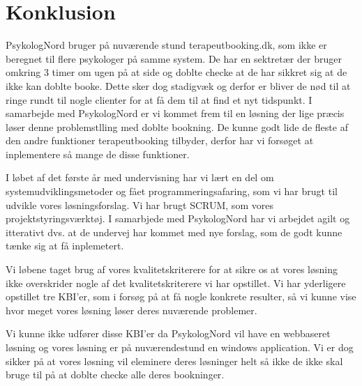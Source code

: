 \section{Konklusion}
PsykologNord bruger på nuværende stund terapeutbooking.dk, som ikke er beregnet til flere psykologer på samme system.
De har en sektretær der bruger omkring 3 timer om ugen på at side og doblte checke at de har sikkret sig at de ikke kan doblte booke.
Dette sker dog stadigvæk og derfor er bliver de nød til at ringe rundt til nogle clienter for at få dem til at find et nyt tidspunkt.
I samarbejde med PsykologNord er vi kommet frem til en løsning der lige præcis løser denne problemstlling med doblte bookning.
De kunne godt lide de fleste af den andre funktioner terapeutbooking tilbyder, derfor har vi forsøget at inplementere så mange de disse funktioner.


I løbet af det første år med undervisning har vi lært en del om systemudviklingsmetoder og fået programmeringsafaring, som vi har brugt til udvikle vores løsningsforslag. Vi har brugt SCRUM, som vores projektstyringsværktøj.
I samarbjede med PsykologNord har vi arbejdet agilt og itterativt dvs. at de undervej har kommet med nye forslag, som de godt kunne tænke sig at få inplemetert.

Vi løbene taget brug af vores kvalitetskriterere for at sikre os at vores løsning ikke overskrider nogle af det kvalitetskriterere vi har opstillet.
Vi har yderligere opstillet tre KBI'er, som i forsøg på at få nogle konkrete resulter, så vi kunne vise hvor meget vores løsning løser deres nuværende problemer.

Vi kunne ikke udfører disse KBI'er da PsykologNord vil have en webbaseret løsning og vores løsning er på nuværendestund en windows application. Vi er dog sikker på at vores løsning vil eleminere deres løsninger helt så ikke de ikke skal bruge til på at doblte checke alle deres bookninger.


